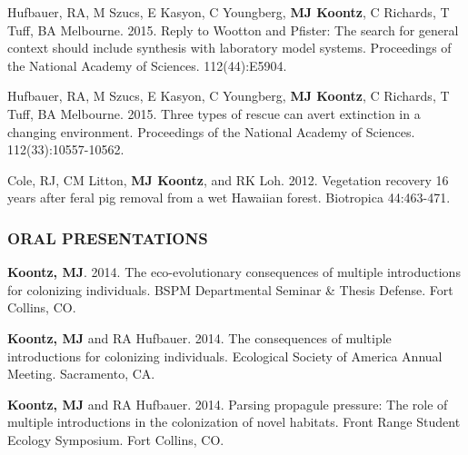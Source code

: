 \documentclass[11pt,english]{article}
\begin{document}
\begin{hangparas}{.5in}{1}

\hspace{0.575em}Hufbauer, RA, M Szucs, E Kasyon, C Youngberg, \textbf{MJ Koontz}, C Richards, T Tuff, BA Melbourne. 2015. Reply to Wootton and Pfister: The search for general context should include synthesis with laboratory model systems. Proceedings of the National Academy of Sciences. 112(44):E5904.

\hspace{0.575em}Hufbauer, RA, M Szucs, E Kasyon, C Youngberg, \textbf{MJ Koontz}, C Richards, T Tuff, BA Melbourne. 2015. Three types of rescue can avert extinction in a changing environment. Proceedings of the National Academy of Sciences. 112(33):10557-10562.

\hspace{0.575em}Cole, RJ, CM Litton, \textbf{MJ Koontz}, and RK
Loh. 2012. Vegetation recovery 16 years after feral pig removal from
a wet Hawaiian forest. Biotropica 44:463-471.

\end{hangparas}
\vspace{1ex}



\subsubsection*{ORAL PRESENTATIONS}
\vspace{-0.5ex}

\begin{hangparas}{.5in}{1}

\hspace{0.575em}\textbf{Koontz, MJ}. 2014. The eco-evolutionary consequences of multiple introductions for colonizing individuals. BSPM Departmental Seminar \& Thesis Defense. Fort Collins, CO.

\hspace{0.575em}\textbf{Koontz, MJ} and RA Hufbauer. 2014. The consequences of multiple introductions for colonizing individuals. Ecological Society of America Annual Meeting. Sacramento, CA.

\hspace{0.575em}\textbf{Koontz, MJ} and RA Hufbauer. 2014. Parsing propagule pressure: The role of multiple introductions in the colonization of novel habitats. Front Range Student Ecology Symposium. Fort Collins, CO.

\end{hangparas}
\vspace{1ex}
\end{document}
